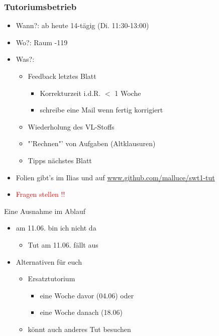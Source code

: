 \documentclass[18pt]{beamer}
\begin{document}
	\begin{frame}
		\frametitle{Tutoriumsbetrieb}
		\begin{itemize}
			\item Wann?: ab heute 14-tägig (Di. 11:30-13:00)
			\item Wo?: Raum -119
			\item Was?: 
			\pause
			\begin{itemize}
				\item Feedback letztes Blatt
				\begin{itemize}
					\item Korrekturzeit i.d.R. $<$ 1 Woche
					\item schreibe eine Mail wenn fertig korrigiert
				\end{itemize}
				\item Wiederholung des VL-Stoffs
				\item "'Rechnen"' von Aufgaben (Altklausuren)
				\item Tipps nächstes Blatt
			\end{itemize}
		\pause
			\item Folien gibt's im Ilias und auf \url{www.github.com/malluce/swt1-tut}
			\pause
			\item \textcolor{red}{Fragen stellen !!}
		\end{itemize}
	\end{frame}

	\begin{frame}{Eine Ausnahme im Ablauf}
		\begin{itemize}
			\item am 11.06. bin ich nicht da
			\begin{itemize}
				\item Tut am 11.06. fällt aus
			\end{itemize}
			\item Alternativen für euch
			\begin{itemize}
				\item Ersatztutorium
				\begin{itemize}
					\item eine Woche davor (04.06) oder 
					\item eine Woche danach (18.06)
				\end{itemize}
				\item könnt auch anderes Tut besuchen
			\end{itemize}
		\end{itemize}
\end{frame}
\end{document}
